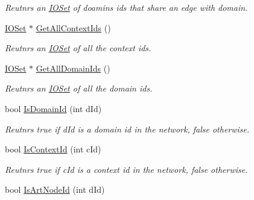 \begin{DoxyCompactItemize}
\begin{DoxyCompactList}\small\item\em Reutnrs an \hyperlink{class_i_o_set}{IOSet} of doamins ids that share an edge with domain. \item\end{DoxyCompactList}\item 
\hypertarget{class_relation_graph_a3ce2cfa6d1becccfdef2f7fc851026d5}{
\hyperlink{class_i_o_set}{IOSet} $\ast$ \hyperlink{class_relation_graph_a3ce2cfa6d1becccfdef2f7fc851026d5}{GetAllContextIds} ()}
\label{class_relation_graph_a3ce2cfa6d1becccfdef2f7fc851026d5}

\begin{DoxyCompactList}\small\item\em Reutnrs an \hyperlink{class_i_o_set}{IOSet} of all the context ids. \item\end{DoxyCompactList}\item 
\hypertarget{class_relation_graph_ac4d09659ad3e4a4856abe9b15edc0105}{
\hyperlink{class_i_o_set}{IOSet} $\ast$ \hyperlink{class_relation_graph_ac4d09659ad3e4a4856abe9b15edc0105}{GetAllDomainIds} ()}
\label{class_relation_graph_ac4d09659ad3e4a4856abe9b15edc0105}

\begin{DoxyCompactList}\small\item\em Reutnrs an \hyperlink{class_i_o_set}{IOSet} of all the domain ids. \item\end{DoxyCompactList}\item 
\hypertarget{class_relation_graph_ab7cc26b947be79d26f078da0dc1936eb}{
bool \hyperlink{class_relation_graph_ab7cc26b947be79d26f078da0dc1936eb}{IsDomainId} (int dId)}
\label{class_relation_graph_ab7cc26b947be79d26f078da0dc1936eb}

\begin{DoxyCompactList}\small\item\em Reutnrs true if dId is a domain id in the network, false otherwise. \item\end{DoxyCompactList}\item 
\hypertarget{class_relation_graph_adbbbff1b919cf1c4f86620a0bd925cc4}{
bool \hyperlink{class_relation_graph_adbbbff1b919cf1c4f86620a0bd925cc4}{IsContextId} (int cId)}
\label{class_relation_graph_adbbbff1b919cf1c4f86620a0bd925cc4}

\begin{DoxyCompactList}\small\item\em Reutnrs true if cId is a context id in the network, false otherwise. \item\end{DoxyCompactList}\item 
\hypertarget{class_relation_graph_ade2826ead12d3490011e878957140e59}{
bool \hyperlink{class_relation_graph_ade2826ead12d3490011e878957140e59}{IsArtNodeId} (int dId)}
\label{class_relation_graph_ade2826ead12d3490011e878957140e59}


\end{DoxyCompactItemize}
